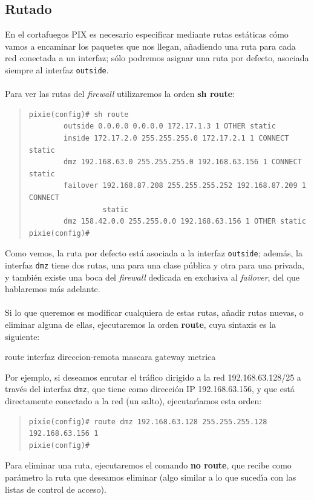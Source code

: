 \subsection{Rutado}
En el cortafuegos PIX es necesario especificar mediante rutas est\'aticas 
c\'omo vamos a encaminar los paquetes que nos llegan, a\~nadiendo una ruta para 
cada red conectada a un interfaz; s\'olo podremos asignar una ruta por defecto,
asociada siempre al interfaz {\tt outside}.\\
\\Para ver las rutas del {\it firewall} utilizaremos la orden {\bf sh route}:
\begin{quote}
\begin{verbatim}
pixie(config)# sh route
        outside 0.0.0.0 0.0.0.0 172.17.1.3 1 OTHER static
        inside 172.17.2.0 255.255.255.0 172.17.2.1 1 CONNECT static
        dmz 192.168.63.0 255.255.255.0 192.168.63.156 1 CONNECT static
        failover 192.168.87.208 255.255.255.252 192.168.87.209 1 CONNECT 
                 static
        dmz 158.42.0.0 255.255.0.0 192.168.63.156 1 OTHER static
pixie(config)# 
\end{verbatim}
\end{quote}
Como vemos, la ruta por defecto est\'a asociada a la interfaz {\tt outside};
adem\'as, la interfaz {\tt dmz} tiene dos rutas, una para una clase p\'ublica y
otra para una privada, y tambi\'en existe una boca del {\it firewall} dedicada
en exclusiva al {\it failover}, del que hablaremos m\'as adelante.\\
\\Si lo que queremos es modificar cualquiera de estas rutas, a\~nadir rutas
nuevas, o eliminar alguna de ellas, ejecutaremos la orden {\bf route}, cuya
sintaxis es la siguiente:
\begin{center}
route interfaz direccion-remota mascara gateway metrica
\end{center}
Por ejemplo, si deseamos enrutar el tr\'afico dirigido a la red 
192.168.63.128/25 a trav\'es del interfaz {\tt dmz}, que tiene como direcci\'on
IP 192.168.63.156, y que est\'a directamente conectado a la red (un salto), 
ejecutar\'{\i}amos esta orden:
\begin{quote}
\begin{verbatim}
pixie(config)# route dmz 192.168.63.128 255.255.255.128 192.168.63.156 1
pixie(config)# 
\end{verbatim}
\end{quote}
Para eliminar una ruta, ejecutaremos el comando {\bf no route}, que recibe como
par\'ametro la ruta que deseamos eliminar (algo similar a lo que suced\'{\i}a 
con las listas de control de acceso).
